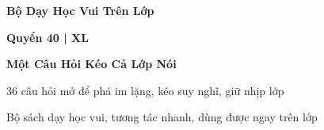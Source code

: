 \begin{titlepage}
\centering
\vspace*{2.2cm}
{\Large\bfseries\color{chapterline} Bộ Dạy Học Vui Trên Lớp\par}
\vspace{0.25cm}
{\large\bfseries\color{chapterline} Quyển 40 \;|\; XL\par}
\vspace{1cm}
{\fontsize{24}{30}\selectfont\bfseries\color{titlecolor} Một Câu Hỏi Kéo Cả Lớp Nói\par}
\vspace{0.7cm}
{\large 36 câu hỏi mở để phá im lặng, kéo suy nghĩ, giữ nhịp lớp\par}
\vfill
{\normalsize Bộ sách dạy học vui, tương tác nhanh, dùng được ngay trên lớp\par}
\vspace*{1.8cm}
\end{titlepage}
